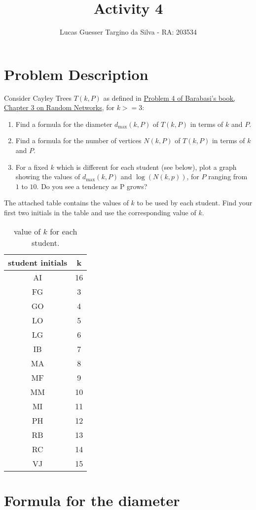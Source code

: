 \documentclass{article}
\title{Activity 4}
\author{Lucas Guesser Targino da Silva - RA: 203534}
\begin{document}
\section{Problem Description}

Consider Cayley Trees $T(k, P)$ as defined in
\href{http://networksciencebook.com/chapter/3#homework3}{Problem 4 of Barabasi's book, Chapter 3 on Random Networks}, for $k >= 3$:

\begin{enumerate}
	\item Find a formula for the diameter $d_{\max}(k, P)$ of $T(k, P)$ in terms of $k$ and $P$.
	\item Find a formula for the number of vertices $N(k, P)$ of $T(k, P)$ in terms of $k$ and $P$.
	\item For a fixed $k$ which is different for each student (see below), plot a graph showing the values of $d_{\max}(k, P)$ and $\log(N(k, p))$, for $P$ ranging from $1$ to $10$.  Do you see a tendency as P grows?
\end{enumerate}

The attached table contains the values of $k$ to be used by each student.  Find your first two initials in the table and use the corresponding value of $k$.

\begin{table}[!ht]
	\centering
	\begin{tabular}{|c|c|}
		\hline
		student initials & k\\\hline\hline
		AI & 16 \\\hline
		FG & 3 \\\hline
		GO & 4 \\\hline
		LO & 5 \\\hline
		LG & 6 \\\hline
		IB & 7 \\\hline
		MA & 8 \\\hline
		MF & 9 \\\hline
		MM & 10 \\\hline
		MI & 11 \\\hline
		PH & 12 \\\hline
		RB & 13 \\\hline
		RC & 14 \\\hline
		VJ & 15 \\\hline
	\end{tabular}
	\caption{value of $k$ for each student.}
\end{table}

\section{Formula for the diameter}
\end{document}
